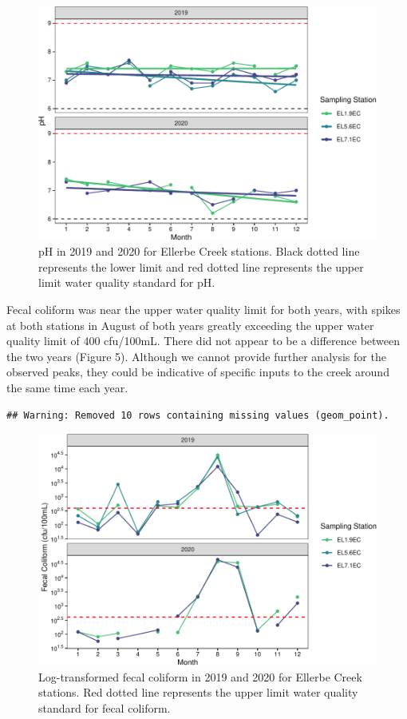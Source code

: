 \documentclass[
  12pt,
]{article}
\begin{document}
\begin{figure}
\centering
\includegraphics{August_Lindborg_ENV872_Project_files/figure-latex/unnamed-chunk-6-1.pdf}
\caption{pH in 2019 and 2020 for Ellerbe Creek stations. Black dotted
line represents the lower limit and red dotted line represents the upper
limit water quality standard for pH.}
\end{figure}

Fecal coliform was near the upper water quality limit for both years,
with spikes at both stations in August of both years greatly exceeding
the upper water quality limit of 400 cfu/100mL. There did not appear to
be a difference between the two years (Figure 5). Although we cannot
provide further analysis for the observed peaks, they could be
indicative of specific inputs to the creek around the same time each
year.

\begin{verbatim}
## Warning: Removed 10 rows containing missing values (geom_point).
\end{verbatim}

\begin{figure}
\centering
\includegraphics{August_Lindborg_ENV872_Project_files/figure-latex/unnamed-chunk-7-1.pdf}
\caption{Log-transformed fecal coliform in 2019 and 2020 for Ellerbe
Creek stations. Red dotted line represents the upper limit water quality
standard for fecal coliform.}
\end{figure}
\end{document}
